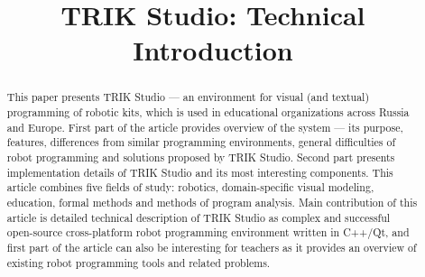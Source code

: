 \documentclass[conference]{IEEEtran}
\begin{document}
\title{TRIK Studio: Technical Introduction}
\date{}%

\author{
\and
\and
}

\maketitle

\begin{abstract}
This paper presents TRIK Studio --- an environment for visual (and textual) programming of robotic kits, which is used in educational organizations across Russia and Europe. First part of the article provides overview of the system --- its purpose, features, differences from similar programming environments, general difficulties of robot programming and solutions proposed by TRIK Studio. Second part presents implementation details of TRIK Studio and its most interesting components. This article combines five fields of study: robotics, domain-specific visual modeling, education, formal methods and methods of program analysis. Main contribution of this article is detailed technical description of TRIK Studio as complex and successful open-source cross-platform robot programming environment written in C++/Qt, and first part of the article can also be interesting for teachers as it provides an overview of existing robot programming tools and related problems.
\end{abstract}
\end{document}
